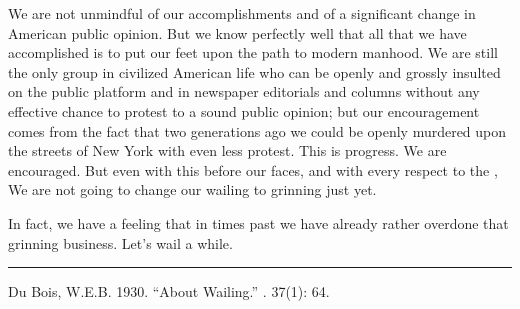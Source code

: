\documentclass[letterpaper,10pt,english]{jupyterBook}
\begin{document}
\sphinxAtStartPar
We are not unmindful of our accomplishments and of a significant change in American public opinion. But we know perfectly well that all that we have accomplished is to put our feet upon the path to modern manhood. We are still the only group in civilized American life who can be openly and grossly insulted on the public platform and in newspaper editorials and columns without any effective chance to protest to a sound public opinion; but our encouragement comes from the fact that two generations ago we could be openly murdered upon the streets of New York with even less protest. This is progress. We are encouraged. But even with this before our faces, and with every respect to the , We are not going to change our wailing to grinning just yet.

\sphinxAtStartPar
In fact, we have a feeling that in times past we have already rather overdone that grinning business. Let’s wail a while.


\bigskip\hrule\bigskip


\sphinxAtStartPar
{} Du Bois, W.E.B. 1930. “About Wailing.” . 37(1): 64.
\end{document}

